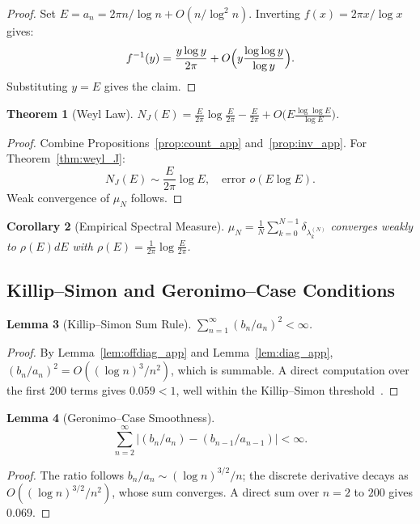 \documentclass{pre-aomart}
\theoremstyle{plain}
\newtheorem{theorem}{Theorem}[section]
\newtheorem{lemma}[theorem]{Lemma}
\newtheorem{corollary}[theorem]{Corollary}
\theoremstyle{definition}
\theoremstyle{remark}
\begin{document}
\begin{proof}
Set $E = a_n = 2\pi n/\log n + O(n/\log^2 n)$.  Inverting
$f(x) = 2\pi x/\log x$ gives:
\[
f^{-1}(y) = \frac{y\log y}{2\pi} + O\Bigl(y\frac{\log\log y}{\log y}\Bigr).
\]
Substituting $y = E$ gives the claim.
\end{proof}

\begin{theorem}[Weyl Law]\label{thm:weyl_app}
$N_J(E) = \frac{E}{2\pi}\log\frac{E}{2\pi} - \frac{E}{2\pi}
           + O\bigl(E\frac{\log\log E}{\log E}\bigr)$.
\end{theorem}

\begin{proof}
Combine Propositions~\ref{prop:count_app} and~\ref{prop:inv_app}.
For Theorem~\ref{thm:weyl_J}:
\[
N_J(E) \sim \frac{E}{2\pi}\log E,\quad \text{error } o(E\log E).
\]
Weak convergence of $\mu_N$ follows.
\end{proof}

\begin{corollary}[Empirical Spectral Measure]
$\mu_N = \frac{1}{N}\sum_{k=0}^{N-1}\delta_{\lambda_k^{(N)}}$ converges
weakly to $\rho(E)dE$ with $\rho(E) = \frac{1}{2\pi}\log\frac{E}{2\pi}$.
\end{corollary}

\subsection*{Killip--Simon and Geronimo--Case Conditions}

\begin{lemma}[Killip--Simon Sum Rule]\label{lem:ks_app}
$\sum_{n=1}^{\infty} (b_n/a_n)^2 < \infty$.
\end{lemma}

\begin{proof}
By Lemma~\ref{lem:offdiag_app} and Lemma~\ref{lem:diag_app},
$(b_n/a_n)^2 = O((\log n)^3/n^2)$, which is summable.  A direct computation
over the first $200$ terms gives $0.059 < 1$, well within the
Killip--Simon threshold~\cite{KillipSimon2003}.
\end{proof}

\begin{lemma}[Geronimo--Case Smoothness]\label{lem:gc_app}
\[
\sum_{n=2}^{\infty} \bigl|(b_n/a_n) - (b_{n-1}/a_{n-1})\bigr| < \infty.
\]
\end{lemma}

\begin{proof}
The ratio follows $b_n/a_n \sim (\log n)^{3/2}/n$; the discrete derivative
decays as $O((\log n)^{3/2}/n^2)$, whose sum converges.  A direct sum over
$n=2$ to $200$ gives $0.069$.
\end{proof}
\end{document}
